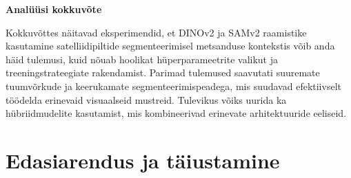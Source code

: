 \textbf{Analüüsi kokkuvõte}

Kokkuvõttes näitavad eksperimendid, et DINOv2 ja SAMv2 raamistike kasutamine satelliidipiltide segmenteerimisel metsanduse kontekstis võib anda häid tulemusi, kuid nõuab hoolikat hüperparameetrite valikut ja treeningstrateegiate rakendamist. Parimad tulemused saavutati suuremate tuumvõrkude ja keerukamate segmenteerimispeadega, mis suudavad efektiivselt töödelda erinevaid visuaalseid mustreid. Tulevikus võiks uurida ka hübriidmudelite kasutamist, mis kombineerivad erinevate arhitektuuride eeliseid.

\section{Edasiarendus ja täiustamine}

